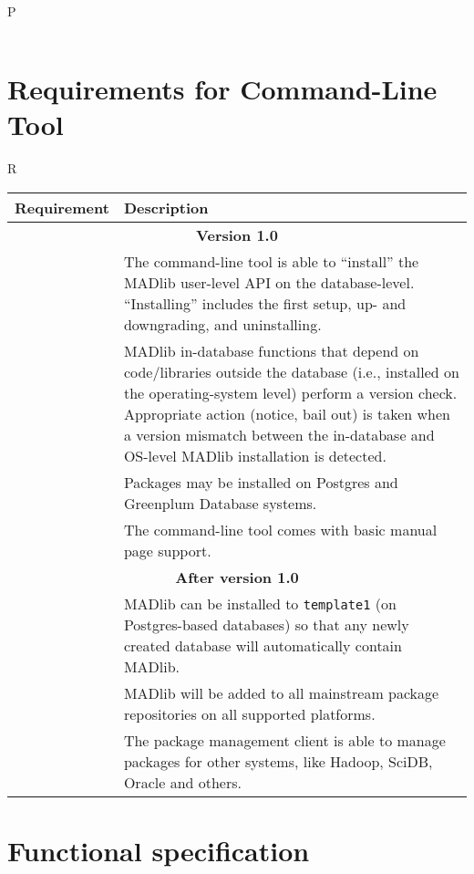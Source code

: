 \documentclass[11pt]{article}
\begin{document}
{\begin{mlreq}{P}
\begin{tabular}{|l|p{133mm}|}
\end{tabular}
\end{mlreq}

\section{Requirements for Command-Line Tool}

\begin{mlreq}{R}
\begin{tabular}{|l|p{133mm}|}
\hline
	\textbf{Requirement} & \textbf{Description} \\
\hline
	\multicolumn{2}{|c|}{\bf Version 1.0} \\
\hline
	\mlr & The command-line tool is able to ``install'' the MADlib user-level API on the database-level. ``Installing'' includes the first setup, up\nobreakdash- and downgrading, and uninstalling. \\
\hline
	\mlr & MADlib in-database functions that depend on code/libraries outside the database (i.e., installed on the operating-system level) perform a version check. Appropriate action (notice, bail out) is taken when a version mismatch between the in-database and OS-level MADlib installation is detected. \\
\hline
	\mlr & Packages may be installed on Postgres and Greenplum Database
		   systems. \\
\hline
	\mlr & The command-line tool comes with basic manual page support.\\

\hline
	\multicolumn{2}{|c|}{\bf After version 1.0} \\
\hline
	\mlr & MADlib can be installed to \texttt{template1} (on Postgres-based databases) so that any
newly created database will automatically contain MADlib. \\
\hline
	\mlr & MADlib will be added to all mainstream package repositories on all supported platforms. \\
\hline
	\mlr & The package management client is able to manage packages for other
		   systems, like Hadoop, SciDB, Oracle and others. \\
\hline

\end{tabular}
\end{mlreq}

\ifx\pdfoutput\undefined %
\else
{}
\fi

\section{Functional specification}

}
\end{document}
